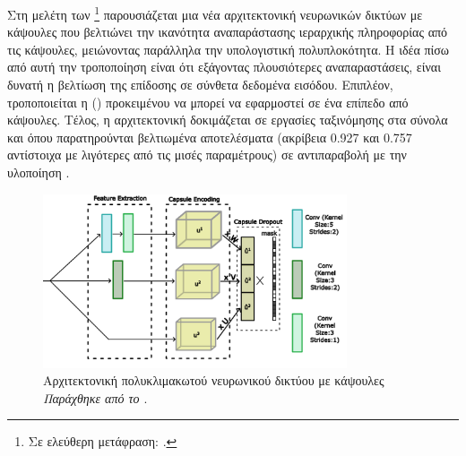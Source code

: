 \subsubsection{}

Στη μελέτη των  \footnote{Σε ελεύθερη μετάφραση: .} \cite{xiang2018ms} παρουσιάζεται μια νέα αρχιτεκτονική νευρωνικών δικτύων με κάψουλες που βελτιώνει την ικανότητα αναπαράστασης ιεραρχικής πληροφορίας από τις κάψουλες, μειώνοντας παράλληλα την υπολογιστική πολυπλοκότητα. Η ιδέα πίσω από αυτή την τροποποίηση είναι ότι εξάγοντας πλουσιότερες αναπαραστάσεις, είναι δυνατή η βελτίωση της επίδοσης σε σύνθετα δεδομένα εισόδου. Επιπλέον, τροποποιείται η  () προκειμένου να μπορεί να εφαρμοστεί σε ένα επίπεδο από κάψουλες. Τέλος, η αρχιτεκτονική δοκιμάζεται σε εργασίες ταξινόμησης στα σύνολα  και  όπου παρατηρούνται βελτιωμένα αποτελέσματα (ακρίβεια 0.927 και 0.757 αντίστοιχα με λιγότερες από τις μισές παραμέτρους) σε αντιπαραβολή με την υλοποίηση \cite{sabour2017dynamic}.\par

\begin{figure}[h]
    \centering
    \includegraphics[width=0.8\textwidth]{images/chapter realted work/ms_capsnet.pdf}
    \caption{Αρχιτεκτονική πολυ\textendash κλιμακωτού νευρωνικού δικτύου με κάψουλες \textit{Παράχθηκε από το \href{https://inkscape.org/}{}}.}
    \label{fig:ms_capsnet}
\end{figure}

